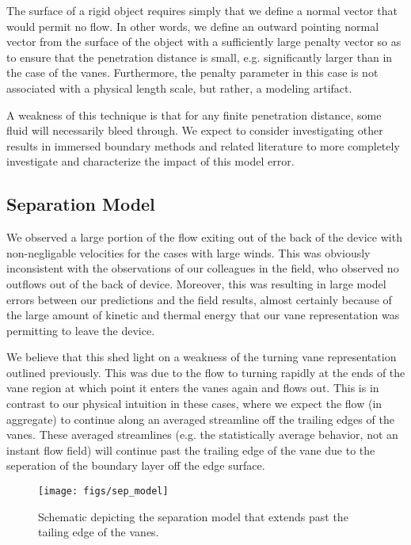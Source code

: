 The surface of a rigid object requires simply that we
define a normal vector that would permit no flow. In other words, we
define an outward pointing normal vector from the surface of the object
with a sufficiently large penalty vector so as to ensure that the
penetration distance is small, e.g. significantly larger than in the
case of the vanes. Furthermore, the penalty parameter in this case is
not associated with a physical length scale, but rather, a modeling
artifact. 


A weakness of this technique is that for
any finite penetration distance, some fluid will necessarily bleed
through. We expect to consider investigating other results in 
immersed boundary methods and related literature to more completely
investigate and characterize the impact of this model error.  


\subsection{Separation Model}

We observed a large portion of the flow exiting out of the back of 
the device with non-negligable velocities for the cases with large winds. 
This was obviously inconsistent with the observations of our colleagues 
in the field, who observed no outflows out of the back of device. 
Moreover, this was resulting in large model errors between our predictions and the 
field results, almost certainly because of the large amount of kinetic and thermal 
energy that our vane representation was permitting to leave the device. 

We believe that this shed light on a weakness of the turning vane representation 
outlined previously. This was due to the flow to turning rapidly at the ends of the vane
region at which point it enters the vanes again and flows out. This is in contrast to our 
physical intuition in these cases, where we expect the flow (in aggregate) to continue along an 
averaged streamline off the trailing edges of the vanes. These averaged streamlines 
(e.g. the statistically average behavior, not an instant flow field) will continue 
past the trailing edge of the vane due to the seperation of the boundary layer off the edge surface.


\begin{figure}[!htb]
  \begin{center}
    \texttt{[image: figs/sep\_model]}
    \caption{Schematic depicting the separation model that extends past the tailing edge of the vanes.}
    \label{fig:sep_model}
  \end{center}
\end{figure}

